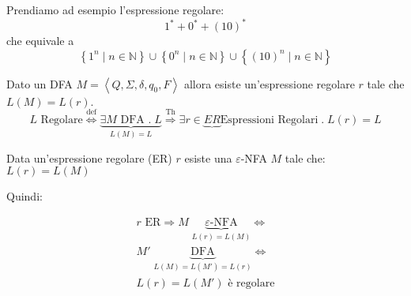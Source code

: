 \documentclass[a4paper]{article}
\begin{document}
\begin{example}
  Prendiamo ad esempio l'espressione regolare:
  \[
    1^* + 0^* + (10)^*
  \] 
  che equivale a
  \[
    \left\{ 1^n \;\left|\; n \in \mathbb{N} \right. \right\} \cup 
    \left\{ 0^n \;\left|\; n \in \mathbb{N} \right. \right\} \cup
    \left\{ (10)^n \;\left|\; n \in \mathbb{N} \right. \right\}
  \] 
\end{example}

\begin{theorem}
  Dato un DFA \( M = \left< Q, \Sigma, \delta, q_0, F \right> \) allora esiste
  un'espressione regolare \( r \) tale che \( L(M) = L(r) \).
  \[
    L \text{ Regolare} \stackrel{\text{def}}{\iff}
    \underbrace{\exists M \text{ DFA }.\; L}_{L(M) = L}
    \stackrel{\text{Th}}{\Rightarrow} \exists r \in \underbrace{ER}{\text{Espressioni Regolari}} \;.\; L(r) = L
  \] 
\end{theorem}
\begin{theorem}
  Data un'espressione regolare (ER) \( r \) esiste una \( \varepsilon \)-NFA \( M \)
  tale che: \( L(r) = L(M) \) 

  \vspace{1em}
  \noindent
  Quindi:
  \begin{figure}[H]
    \centering
  \end{figure}
  \begin{figure}[H]
    \centering
  \end{figure}
  \label{20-10-D1}

  \[
    \begin{aligned}
      r \text{ ER} \Rightarrow M \; \underbrace{\varepsilon\text{-NFA}}_{L(r) = L(M)} \iff\\
      M' \; \underbrace{\text{DFA}}_{L(M) = L(M') = L(r)} \iff\\
      L(r) = L(M') \text{ è regolare}
    \end{aligned}
  \] 
\end{theorem}
\end{document}
